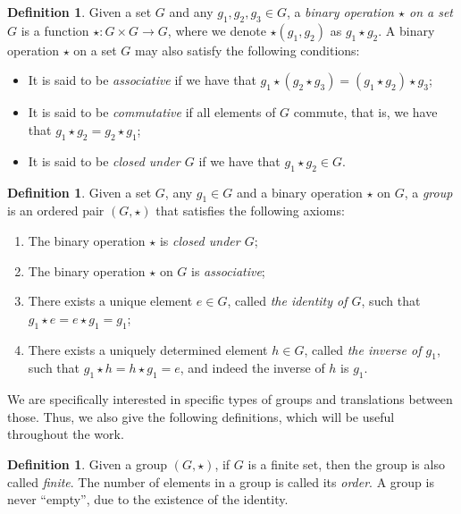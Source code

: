 \documentclass[draft, 12pt, a4paper, oneside]{memoir}
\theoremstyle{definition}
\newtheorem{definition}[theorem]{Definition}
\begin{document}
\begin{definition}
  Given a set $G$ and any $g_{1}, g_{2}, g_{3} \in G$, a \emph{binary operation $\star$ on a set $G$} is a function $\star : G \times G \to G$, where we denote $\star(g_{1}, g_{2})$ as $g_{1} \star g_{2}$. A binary operation $\star$ on a set $G$ may also satisfy the following conditions:
  
  \begin{itemize}
    \item It is said to be \emph{associative} if we have that $g_{1} \star (g_{2} \star g_{3}) = (g_{1} \star g_{2}) \star g_{3}$;
    \item It is said to be \emph{commutative} if all elements of $G$ commute, that is, we have that $g_{1} \star g_{2} = g_{2} \star g_{1}$;
    \item It is said to be \emph{closed under $G$} if we have that $g_{1} \star g_{2} \in G$.
  \end{itemize}
\end{definition}

\begin{definition}
  Given a set $G$, any $g_{1} \in G$ and a binary operation $\star$ on $G$, a \emph{group} is an ordered pair $(G, \star)$ that satisfies the following axioms:
  
  \begin{enumerate}
    \item The binary operation $\star$ is \emph{closed under $G$};
    \item The binary operation $\star$ on $G$ is \emph{associative};
    \item There exists a unique element $e \in G$, called \emph{the identity of $G$}, such that $g_{1} \star e = e \star g_{1} = g_{1}$;
    \item There exists a uniquely determined element $h \in G$, called \emph{the inverse of $g_{1}$}, such that $g_{1} \star h = h \star g_{1} = e$, and indeed the inverse of $h$ is $g_{1}$.
  \end{enumerate}
\end{definition}

We are specifically interested in specific types of groups and translations between those. Thus, we also give the following definitions, which will be useful throughout the work.

\begin{definition}
  Given a group $(G, \star)$, if $G$ is a finite set, then the group is also called \emph{finite}. The number of elements in a group is called its \emph{order}. A group is never ``empty'', due to the existence of the identity.
\end{definition}
\end{document}

